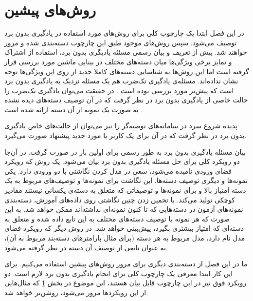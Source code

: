 \chapter{روش‌های پیشین}
در این فصل ابتدا یک چارچوب کلی برای روش‌های مورد استفاده در یادگیری بدون برد توصیف می‌شود. سپس روش‌های موجود طبق این چارچوب دسته‌بندی شده و مرور خواهند شد. پیش از تعریف و بیان رسمی مسئثه یادیگری بدون برد، استفاده از اشتراک و تمایز برخی ویژگی‌ها میان دسته‌های مختلف در بینایی ماشین مورد بررسی قرار گرفته است
\cite{BakkerH03, TsochantaridisJHA05, ulman2005}
اما این روش‌ها به شناسایی دسته‌های کاملا جدید از روی این ویژگی‌ها توجه نشان نداده‌اند.
مسئله‌ی یادگیری تک‌ضرب
هم یک مسئله نزدیک به یادگیری بدون برد است که پیش‌تر مورد بررسی بوده است
\cite{miller12}.
در حقیقت می‌توان یادگیری تک‌ضرب را حالت خاصی از یادگیری بدون برد در نظر گرفت که در آن توصیف دسته‌های دیده نشده به صورت یک نمونه از آن دسته ارائه شده است
\cite{bengio08}.

 پدیده شروع سرد
 در سامانه‌های توصیه‌گر
 را نیز می‌توان از حالت‌های خاص یادگیری بدون برد در نظر گرفت که در آن برای یک کاربر یا مورد جدید پیشنهاد صورت می‌گیرد.


بیان مسئله  یادگیری بدون برد به طور رسمی برای اولین بار در
\cite{bengio08}
صورت گرفت. در آن‌جا دو رویکرد کلی برای حل مسئله یادگیری بدون برد بیان می‌شود. یک روش که رویکرد فضای ورودی
نامیده می‌شود، سعی در مدل کردن نگاشتی با دو ورودی دارد. یکی نمونه‌ها و دیگری توصیف دسته‌ها. این نگاشت برای نمونه‌ها و توصیف‌های مربوط به یک دسته امتیاز بالا و برای نمونه‌ها و توصیفاتی که متعلق به دسته‌ی یکسانی نیستند مقادیر کوچکی تولید می‌کند. با تخمین زدن چنین نگاشتی روی داده‌های آموزش، دسته‌بندی نمونه‌های آزمون در دسته‌هایی که تا کنون نمونه‌ای نداشته‌اند ممکن خواهد شد. به این صورت که هر نمونه با توصیف دسته‌های مختلف به این تابع داده شده و متعلق به دسته‌ای که امتیاز بیشتری بگیرد، پیش‌بینی خواهد شد.
در روش دیگر که رویکرد فضای مدل
نام دارد، مدل مربوط به هر دسته (برای مثال پارامترهای دسته‌بند مربوط به آن)، به عنوان تابعی از توصیف آن دسته در نظر گرفته می‌شود.

ما در این فصل از دسته‌بندی دیگری برای مرور روش‌های پیشین استفاده می‌کنیم. برای این کار ابتدا معرفی یک چارچوب کلی برای انجام یادگیری بدون برد لازم است. دو رویکرد فوق نیز در این چارچوب قابل بیان هستند، این موضوع در بخش \ref{} که مثال‌هایی از این رویکردها مرور می‌شود، روشن‌تر خواهد شد.

